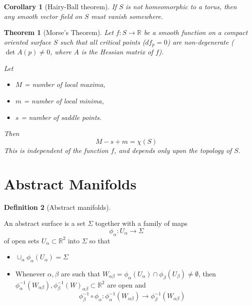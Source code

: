 \documentclass[10pt, oneside, reqno]{amsart}
\newcommand{\R}{\mathbb{R}}
\theoremstyle{plain}%
\newtheorem{thm}{Theorem}[section]
\newtheorem*{cor}{Corollary}
\theoremstyle{definition}
\newtheorem{defn}[thm]{Definition}
\theoremstyle{remark}
\begin{document}
\begin{cor}[Hairy-Ball theorem]
    If $S$ is not homeomorphic to a torus, then any smooth vector field on $S$ must vanish somewhere.
\end{cor}

\begin{thm}[Morse's Theorem]
    Let $f: S \rightarrow \R$ be a smooth function on a compact oriented surface $S$ such that all critical points ($df_p = 0$) are non-degenerate ($\det A(p) \neq 0$, where $A$ is the \emph{Hessian} matrix of $f$).

Let
\begin{itemize}

    \item   $M$ = number of local maxima, 

    \item   $m$ = number of local minima, 

    \item   $s$ = number of saddle points.

\end{itemize}
    
    Then \[
        M - s + m = \chi(S)
    \]
    This is independent of the function $f$, and depends only upon the topology of $S$.
\end{thm}

\section{Abstract Manifolds}

\begin{defn}[Abstract manifolds]
    
\end{defn}
An abstract surface is a set $\Sigma$ together with a family of maps \[
    \phi_\alpha: U_\alpha \rightarrow \Sigma
\] of open sets $U_\alpha \subset \R^2$ into $\Sigma$ so that

\begin{itemize}

    \item $\cup_\alpha \phi_\alpha(U_\alpha) = \Sigma$


    \item Whenever $\alpha, \beta$ are such that $W_{\alpha \beta} = \phi_\alpha (U_\alpha) \cap \phi_\beta (U_\beta) \neq \emptyset$, then $\phi^{-1}_\alpha (W_{\alpha \beta}), \phi^{-1}_\beta (W)_{\alpha \beta} \subset \R^2$ are open and
  \[
    \phi^{-1}_\beta \circ \phi_\alpha : \phi^{-1}_\alpha (W_{\alpha \beta}) \rightarrow \phi^{-1}_\beta (W_{\alpha \beta})
 \]

\end{itemize}
\end{document}
